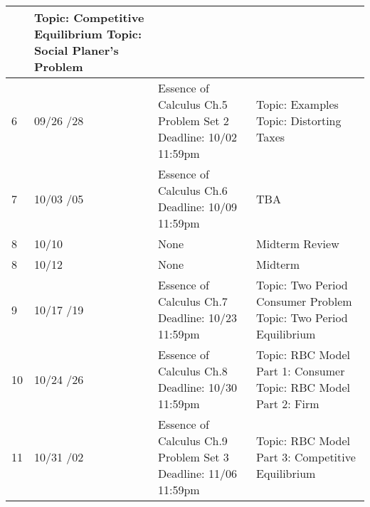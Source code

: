 \documentclass[12pt]{article}
\begin{document}
\begin{tabular}{|p{\bb}|p{\qq}|p{\rr}|p{\pp}|}
        &
        Topic: Competitive Equilibrium
        \newline
        Topic: Social Planer's Problem
    \\
    \hline
        6
        &
        09/26
        \newline
        09/28
        &
        Essence of Calculus Ch.5
        \newline
        Problem Set 2
        \newline
        Deadline: 10/02 11:59pm
        &
        Topic: Examples
        \newline
        Topic: Distorting Taxes
    \\
    \hline
        7
        &
        10/03
        \newline
        10/05
        &
        Essence of Calculus Ch.6
        \newline
        Deadline: 10/09 11:59pm
        &
        TBA
    \\
    \hline
        8
        &
        10/10
        &
        None
        &
        Midterm Review
    \\
    \hline
        8
        &
        10/12
        &
        None
        &
        Midterm
    \\
    \hline
        9
        &
        10/17
        \newline
        10/19
        &
        Essence of Calculus Ch.7
        \newline
        Deadline: 10/23 11:59pm
        &
        Topic: Two Period Consumer Problem
        \newline
        Topic: Two Period Equilibrium
    \\
    \hline
        10
        &
        10/24
        \newline
        10/26
        &
        Essence of Calculus Ch.8
        \newline
        Deadline: 10/30 11:59pm
        &
        Topic: RBC Model Part 1: Consumer
        \newline
        Topic: RBC Model Part 2: Firm
    \\
    \hline
        11
        &
        10/31
        \newline
        11/02
        &
        Essence of Calculus Ch.9
        \newline
        Problem Set 3
        \newline
        Deadline: 11/06 11:59pm
        &
        Topic: RBC Model Part 3: Competitive Equilibrium
    \\

\end{tabular}
\end{document}
